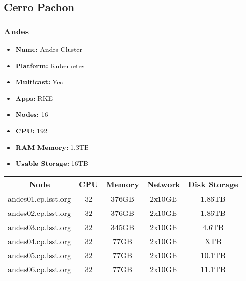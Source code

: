 \newpage
\subsection{Cerro Pachon}
\subsubsection{Andes}
\begin{itemize}
  \itemsep0em 
  \item \textbf{Name:}       Andes Cluster
  \item \textbf{Platform:}   Kubernetes
  \item \textbf{Multicast:}  Yes
  \item \textbf{Apps:}       RKE
  \item \textbf{Nodes:}      16
  \item \textbf{CPU:}        192
  \item \textbf{RAM Memory:} 1.3TB
  \item \textbf{Usable Storage:}   16TB
\end{itemize}
\begin{center}
  \small
  \begin{tabular}{||c c c c c||} 
    \hline
    \textbf{Node} & \textbf{CPU} & \textbf{Memory} & \textbf{Network} & \textbf{Disk Storage} \\ [0.5ex]
    \hline
    andes01.cp.lsst.org & 32 & 376GB & 2x10GB & 1.86TB \\
    \hline
    andes02.cp.lsst.org & 32 & 376GB & 2x10GB & 1.86TB \\
    \hline
    andes03.cp.lsst.org & 32 & 345GB & 2x10GB & 4.6TB \\
    \hline
    andes04.cp.lsst.org & 32 & 77GB & 2x10GB & XTB \\
    \hline
    andes05.cp.lsst.org & 32 & 77GB & 2x10GB & 10.1TB\\
    \hline
    andes06.cp.lsst.org & 32 & 77GB & 2x10GB & 11.1TB \\
    \hline
  \end{tabular}
\end{center}

\newpage
